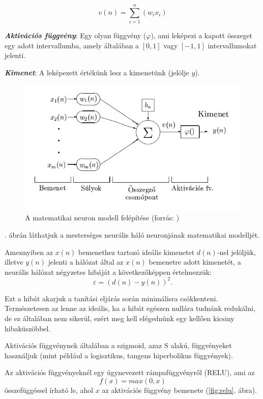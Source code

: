 $$
v(n) = \sum_{i=1}^{n}(w_ix_i)
$$

\textit{\textbf{Aktivációs függvény}}: Egy olyan függvény ($\varphi$), ami leképezi a kapott összeget egy adott intervallumba, amely általában a $[0, 1]$ vagy $[-1, 1]$ intervallumokat jelenti.

\textbf{\textit{Kimenet}}: A leképezett értékünk lesz a kimenetünk (jelölje $y$).

\begin{figure}[h]
	\centering
	\includegraphics[scale=0.6]{images/ANNParts.png}
	\caption{A matematikai neuron modell felépítése (forrás: \cite{neuralis77})}
	\label{fig:ANNParts}
\end{figure}

. ábrán láthatjuk a mesterséges neurális háló neuronjának matematikai modelljét.

Amennyiben az $x(n)$ bemenethez tartozó ideális kimenetet $d(n)$-nel jelöljük, illetve $y(n)$ jelenti a hálózat által az $x(n)$ bemenetre adott kimenetét, a neurális hálózat négyzetes hibáját a következőképpen értelmezzük:
$$
\varepsilon = (d(n) - y(n))^2.
$$

Ezt a hibát akarjuk a tanítási eljárás során minimálisra csökkenteni. Természetesen az lenne az ideális, ha a hibát egészen nullára tudnánk redukálni, de ez általában nem sikerül, ezért meg kell elégednünk egy kellően kicsiny hibaküszöbbel.

Aktivációs függvénynek általában a szigmoid, azaz S alakú, függvényeket használjuk (mint például a logisztikus, tangens hiperbolikus függvények).

Az aktivációs függvényeknél egy úgynevezett rámpafüggvényről (RELU), ami az
$$
f(x) = max(0,x)
$$
összefüggéssel írható le, ahol $x$ az aktivációs függvény bemenete (\ref{fig:relu}. ábra).

